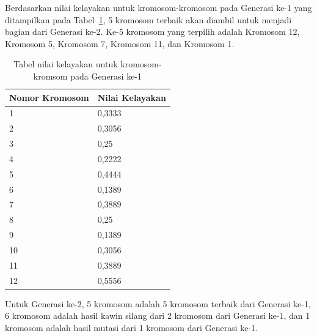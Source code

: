 \documentclass[a4paper,twoside]{article}
\begin{document}
\begin{enumerate}
\clearpage

Berdasarkan nilai kelayakan untuk kromosom-kromosom pada Generasi ke-1 yang ditampilkan pada Tabel~\ref{tab:analisishg2}, 5 kromosom terbaik akan diambil untuk menjadi bagian dari Generasi ke-2. Ke-5 kromosom yang terpilih adalah Kromosom 12, Kromosom 5, Kromosom 7, Kromosom 11, dan Kromosom 1.

\begin{table}
\centering
\captionsetup{justification=centering}
\begin{tabular}{| l | l |}
\hline
Nomor Kromosom & Nilai Kelayakan \\
\hline \hline
1 & 0,3333 \\
\hline
2 & 0,3056 \\
\hline
3 & 0,25 \\
\hline
4 & 0,2222 \\
\hline
5 & 0,4444 \\
\hline
6 & 0,1389 \\
\hline
7 & 0,3889 \\
\hline
8 & 0,25 \\
\hline
9 & 0,1389 \\
\hline
10 & 0,3056 \\
\hline
11 & 0,3889 \\
\hline
12 & 0,5556 \\
\hline
\end{tabular}
\caption[Tabel nilai kelayakan untuk kromosom-kromsom pada Generasi ke-1]{Tabel nilai kelayakan untuk kromosom-kromsom pada Generasi ke-1}
\label{tab:analisishg2}
\end{table}

Untuk Generasi ke-2, 5 kromosom adalah 5 kromosom terbaik dari Generasi ke-1, 6 kromosom adalah hasil kawin silang dari 2 kromosom dari Generasi ke-1, dan 1 kromosom adalah hasil mutasi dari 1 kromosom dari Generasi ke-1.


\end{enumerate}
\end{document}

